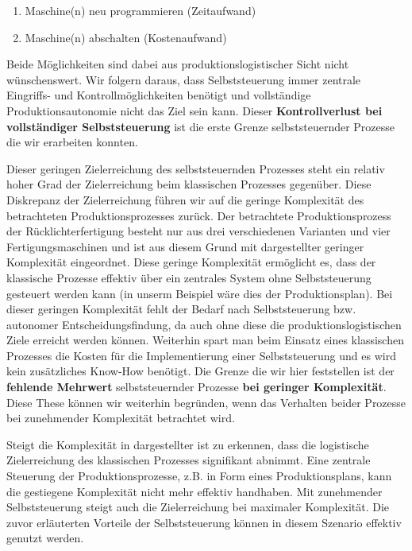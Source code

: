 \begin{enumerate}
  \item Maschine(n) neu programmieren (Zeitaufwand)
  \item Maschine(n) abschalten (Kostenaufwand)
\end{enumerate}

Beide Möglichkeiten sind dabei aus produktionslogistischer Sicht nicht wünschenswert.
Wir folgern daraus, dass Selbststeuerung immer zentrale Eingriffs- und Kontrollmöglichkeiten
benötigt und vollständige Produktionsautonomie nicht das Ziel sein kann. Dieser \textbf{Kontrollverlust
bei vollständiger Selbststeuerung} ist die erste Grenze selbststeuernder Prozesse
die wir erarbeiten konnten.

Dieser geringen Zielerreichung des selbststeuernden Prozesses steht ein relativ
hoher Grad der Zielerreichung beim klassischen Prozesses gegenüber.
Diese Diskrepanz der Zielerreichung führen wir auf die geringe
Komplexität des betrachteten Produktionsprozesses zurück.
Der betrachtete Produktionsprozess der Rücklichterfertigung besteht nur aus
drei verschiedenen Varianten und vier Fertigungsmaschinen und ist aus diesem
Grund mit dargestellter geringer Komplexität eingeordnet. Diese geringe
Komplexität ermöglicht es, dass der klassische Prozesse effektiv über ein zentrales
System ohne Selbststeuerung gesteuert werden kann (in unserm Beispiel wäre dies der Produktionsplan).
Bei dieser geringen Komplexität fehlt der Bedarf nach Selbststeuerung bzw. autonomer Entscheidungsfindung,
da auch ohne diese die produktionslogistischen Ziele erreicht werden können.
Weiterhin spart man beim Einsatz eines klassischen Prozesses die Kosten für 
die Implementierung einer Selbststeuerung und es wird kein zusätzliches 
Know-How benötigt. Die Grenze die wir hier feststellen ist der \textbf{fehlende Mehrwert}
selbststeuernder Prozesse \textbf{bei geringer Komplexität}.
Diese These können wir weiterhin begründen, wenn das Verhalten beider Prozesse
bei zunehmender Komplexität betrachtet wird.

Steigt die Komplexität in dargestellter  ist zu erkennen,
dass die logistische Zielerreichung des klassischen Prozesses signifikant abnimmt.
Eine zentrale Steuerung der Produktionsprozesse, z.B. in Form eines Produktionsplans,
kann die gestiegene Komplexität nicht mehr effektiv handhaben. Mit zunehmender 
Selbststeuerung steigt auch die Zielerreichung bei maximaler Komplexität. Die 
zuvor erläuterten Vorteile der Selbststeuerung können in diesem Szenario effektiv
genutzt werden.

